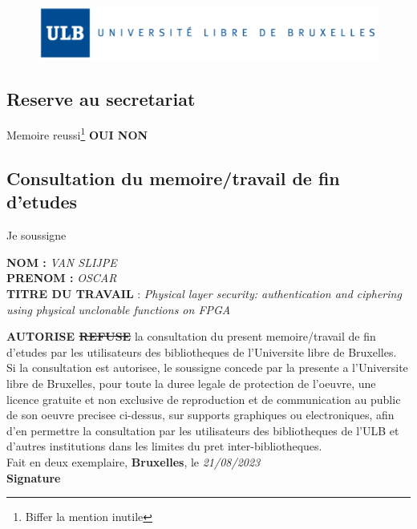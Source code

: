 \begin{figure}
    \centering
    \includegraphics[width=\linewidth]{images/ulb.png}
\end{figure}

\subsection*{Reserve au secretariat}

Memoire reussi\footnote{Biffer la mention inutile} \textbf{OUI NON}\\

\vspace{0.5cm}

\hline

\vspace{0.5cm}

\subsection*{Consultation du memoire/travail de fin d'etudes}


\noindent Je soussigne\\

\begin{minipage}[b]{0.05\linewidth} 
\end{minipage}\hfill
\begin{minipage}[b]{0.95\linewidth}   
\textbf{NOM :} \textit{VAN SLIJPE}\\
\textbf{PRENOM :} \textit{OSCAR}\\
\textbf{TITRE DU TRAVAIL} : \textit{Physical layer security: authentication and ciphering using physical unclonable functions on FPGA}\\
\end{minipage}



\noindent\textbf{AUTORISE \sout{REFUSE}} la consultation du present memoire/travail de fin d'etudes par les utilisateurs des bibliotheques de l'Universite libre de Bruxelles.\\

Si la consultation est autorisee, le soussigne concede par la presente a l'Universite libre de Bruxelles, pour toute la duree legale de protection de l'oeuvre, une licence gratuite et non exclusive de reproduction et de communication au public de son oeuvre precisee ci-dessus, sur supports graphiques ou electroniques, afin d'en permettre la consultation par les utilisateurs des bibliotheques de l'ULB et d'autres institutions dans les limites du pret inter-bibliotheques.\\

Fait en deux exemplaire, \textbf{Bruxelles}, le \textit{21/08/2023}\\
\textbf{Signature}